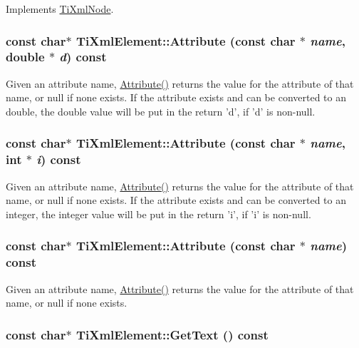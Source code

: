 Implements \hyperlink{class_ti_xml_node_acc0f88b7462c6cb73809d410a4f5bb86}{TiXmlNode}.\hypertarget{class_ti_xml_element_aeaff99d4f0ea5b34f7aee202aad457ba}{
\subsubsection[{Attribute}]{\setlength{\rightskip}{0pt plus 5cm}const char$\ast$ TiXmlElement::Attribute (const char $\ast$ {\em name}, \/  double $\ast$ {\em d}) const}}
\label{class_ti_xml_element_aeaff99d4f0ea5b34f7aee202aad457ba}
Given an attribute name, \hyperlink{class_ti_xml_element_ae419a442a9701a62b0c3d8fd1cbdd12d}{Attribute()} returns the value for the attribute of that name, or null if none exists. If the attribute exists and can be converted to an double, the double value will be put in the return 'd', if 'd' is non-\/null. \hypertarget{class_ti_xml_element_a0ed8348fdc56b72a6b4900ce5bac1849}{
\subsubsection[{Attribute}]{\setlength{\rightskip}{0pt plus 5cm}const char$\ast$ TiXmlElement::Attribute (const char $\ast$ {\em name}, \/  int $\ast$ {\em i}) const}}
\label{class_ti_xml_element_a0ed8348fdc56b72a6b4900ce5bac1849}
Given an attribute name, \hyperlink{class_ti_xml_element_ae419a442a9701a62b0c3d8fd1cbdd12d}{Attribute()} returns the value for the attribute of that name, or null if none exists. If the attribute exists and can be converted to an integer, the integer value will be put in the return 'i', if 'i' is non-\/null. \hypertarget{class_ti_xml_element_ae419a442a9701a62b0c3d8fd1cbdd12d}{
\subsubsection[{Attribute}]{\setlength{\rightskip}{0pt plus 5cm}const char$\ast$ TiXmlElement::Attribute (const char $\ast$ {\em name}) const}}
\label{class_ti_xml_element_ae419a442a9701a62b0c3d8fd1cbdd12d}
Given an attribute name, \hyperlink{class_ti_xml_element_ae419a442a9701a62b0c3d8fd1cbdd12d}{Attribute()} returns the value for the attribute of that name, or null if none exists. \hypertarget{class_ti_xml_element_af3282294986cdb216646ea1f67af2c87}{
\subsubsection[{GetText}]{\setlength{\rightskip}{0pt plus 5cm}const char$\ast$ TiXmlElement::GetText () const}}
